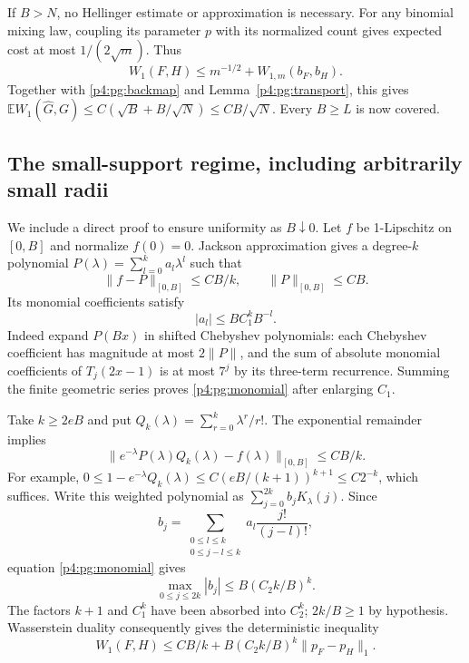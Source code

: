 \documentclass[11pt,a4paper]{article}
\theoremstyle{definition}
\theoremstyle{remark}
\numberwithin{equation}{section}
\begin{document}
If $B>N$, no Hellinger estimate or approximation is necessary.
For any binomial mixing law, coupling its parameter $p$ with its
normalized count gives expected cost at most $1/(2\sqrt m)$.
Thus
\[
 W_1(F,H)\le m^{-1/2}+W_{1,m}(b_F,b_H).
\]
Together with \eqref{p4:pg:backmap} and Lemma~\ref{p4:pg:transport}, this
gives $\mathbb E W_1(\widehat G,G)\le C(\sqrt B+B/\sqrt N)
\le CB/\sqrt N$.  Every $B\ge L$ is now covered.

\subsection{The small-support regime, including arbitrarily small radii}

We include a direct proof to ensure uniformity as $B\downarrow0$.
Let $f$ be 1-Lipschitz on $[0,B]$ and normalize $f(0)=0$.
Jackson approximation gives a degree-$k$ polynomial
$P(\lambda)=\sum_{l=0}^k a_l\lambda^l$ such that
\[
 \|f-P\|_{[0,B]}\le CB/k,\qquad \|P\|_{[0,B]}\le CB.
\]
Its monomial coefficients satisfy
\begin{equation}\label{p4:pg:monomial}
                         |a_l|\le BC_1^kB^{-l}.
\end{equation}
Indeed expand $P(Bx)$ in shifted Chebyshev polynomials: each
Chebyshev coefficient has magnitude at most $2\|P\|$, and the sum
of absolute monomial coefficients of $T_j(2x-1)$ is at most $7^j$
by its three-term recurrence.  Summing the finite geometric series
proves \eqref{p4:pg:monomial} after enlarging $C_1$.

Take $k\ge2eB$ and put $Q_k(\lambda)=\sum_{r=0}^k\lambda^r/r!$.
The exponential remainder implies
\[
 \|e^{-\lambda}P(\lambda)Q_k(\lambda)-f(\lambda)\|_{[0,B]}
                                                    \le CB/k.
\]
For example, $0\le1-e^{-\lambda}Q_k(\lambda)
\le C(eB/(k+1))^{k+1}\le C2^{-k}$, which suffices.
Write this weighted polynomial as $\sum_{j=0}^{2k}b_jK_\lambda(j)$.
Since
\[
 b_j=\sum_{\substack{0\le l\le k\\0\le j-l\le k}}
                      a_l\frac{j!}{(j-l)!},
\]
equation \eqref{p4:pg:monomial} gives
\begin{equation}\label{p4:pg:smallcoeff}
             \max_{0\le j\le2k}|b_j|\le B(C_2 k/B)^k.
\end{equation}
The factors $k+1$ and $C_1^k$ have been absorbed into $C_2^k$;
$2k/B\ge1$ by hypothesis.  Wasserstein duality consequently gives
the deterministic inequality
\begin{equation}\label{p4:pg:smallinverse}
 W_1(F,H)\le CB/k+
                B(C_2 k/B)^k\|p_F-p_H\|_1.
\end{equation}
\end{document}
